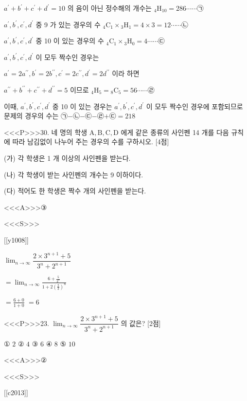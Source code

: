 \documentclass{oblivoir}
\begin{document}
$a^{\prime}+b^{\prime}+c^{\prime}+d^{\prime}=10$ 의 음이 아닌 정수해의 개수는
${ }_{4} \mathrm{H}_{10}=286 \cdots \cdots $㉠

$a^{\prime}, b^{\prime}, c^{\prime}, d^{\prime}$ 중 9 가 있는 경우의 수
${ }_{4} \mathrm{C}_{1} \times{ }_{3} \mathrm{H}_{1}=4 \times 3=12 \cdots \cdots $㉡

$a^{\prime}, b^{\prime}, c^{\prime}, d^{\prime}$ 중 10 이 있는 경우의 수
${ }_{4} \mathrm{C}_{1} \times{ }_{3} \mathrm{H}_{0}=4 \cdots \cdots $㉢

$a^{\prime}, b^{\prime}, c^{\prime}, d^{\prime}$ 이 모두 짝수인 경우는

$a^{\prime}=2 a^{\prime \prime}, b^{\prime}=2 b^{\prime \prime}, c^{\prime}=2 c^{\prime \prime}, d^{\prime}=2 d^{\prime \prime}$ 이라 하면

$a^{\prime \prime}+b^{\prime \prime}+c^{\prime \prime}+d^{\prime \prime}=5 $ 이므로
${ }_{4} \mathrm{H}_{5}={ }_{8} \mathrm{C}_{5}=56 \cdots \cdots $㉣

이때, $a^{\prime}, b^{\prime}, c^{\prime}, d^{\prime}$ 중 10 이 있는 경우는 $a^{\prime}, b^{\prime}, c^{\prime}, d^{\prime}$ 이 모두 짝수인 경우에 포함되므로 문제의 경우의 수는 ㉠$-$㉡$-$㉢$-$㉣$+$㉢$=218$


<<<P>>>30. 네 명의 학생 $\mathrm{A}, \mathrm{B}, \mathrm{C}, \mathrm{D}$ 에게 같은 종류의 사인펜 14 개를 다음 규칙에 따라 남김없이 나누어 주는 경우의 수를 구하시오. [4점]

(가) 각 학생은 1 개 이상의 사인펜을 받는다.

(나) 각 학생이 받는 사인펜의 개수는 9 이하이다.

(다) 적어도 한 학생은 짝수 개의 사인펜을 받는다.


<<<A>>>③

<<<S>>>

[[y1008]]

$\displaystyle \lim _{n \rightarrow \infty} \dfrac{2 \times 3^{n+1}+5}{3^{n}+2^{n+1}}$

$=\displaystyle \lim _{n \rightarrow \infty} \frac{6+\frac{5}{3^{n}}}{1+2\left(\frac{2}{3}\right)^{n}}$

$=\frac{6+0}{1+0}$
$=6$


<<<P>>>23. $\displaystyle \lim _{n \rightarrow \infty} \dfrac{2 \times 3^{n+1}+5}{3^{n}+2^{n+1}}$ 의 값은? [2점]

① $2$
② $4$
③ $6$
④ $8$
⑤ $10$


<<<A>>>②

<<<S>>>

[[c2013]]
\end{document}
